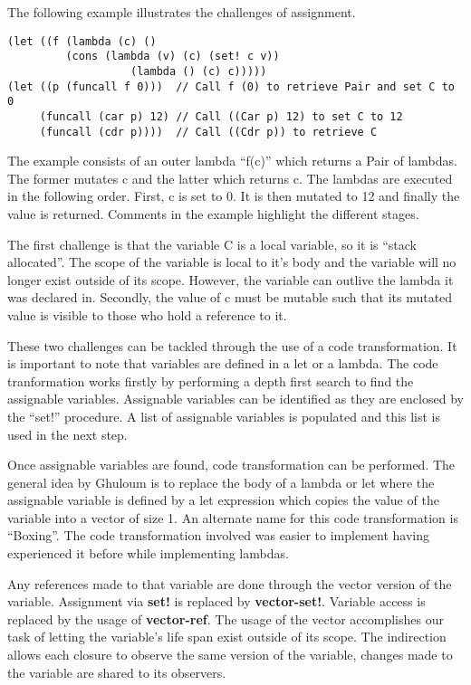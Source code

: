 \documentclass{article}
\begin{document}
The following example illustrates the challenges of assignment.

\begin{verbatim}
(let ((f (lambda (c) ()
     	 (cons (lambda (v) (c) (set! c v))
	       	       (lambda () (c) c)))))
(let ((p (funcall f 0)))  // Call f (0) to retrieve Pair and set C to 0
     (funcall (car p) 12) // Call ((Car p) 12) to set C to 12
     (funcall (cdr p))))  // Call ((Cdr p)) to retrieve C

\end{verbatim}

The example consists of an outer lambda ``f(c)'' which returns a Pair of lambdas. The former mutates c and the latter which returns c. The lambdas are executed in the following order. First, c is set to 0. It is then mutated to 12 and finally the value is returned. Comments in the example highlight the different stages.

The first challenge is that the variable C is a local variable, so it is ``stack allocated''. The scope of the variable is local to it's body and the variable will no longer exist outside of its scope. However, the variable can outlive the lambda it was declared in. Secondly, the value of c must be mutable such that its mutated value is visible to those who hold a reference to it.

These two challenges can be tackled through the use of a code transformation. It is important to note that variables are defined in a let or a lambda. The code tranformation works firstly by performing a depth first search to find the assignable variables. Assignable variables can be identified as they are enclosed by the ``set!'' procedure. A list of assignable variables is populated and this list is used in the next step. 

Once assignable variables are found, code transformation can be performed. The general idea by Ghuloum is to replace the body of a lambda or let where the assignable variable is defined by a let expression which copies the value of the variable into a vector of size 1. An alternate name for this code transformation is ``Boxing''. The code transformation involved was easier to implement having experienced it before while implementing lambdas. 

Any references made to that variable are done through the vector version of the variable. Assignment via \textbf{set!} is replaced by \textbf{vector-set!}. Variable access is replaced by the usage of \textbf{vector-ref}. The usage of the vector accomplishes our task of letting the variable's life span exist outside of its scope. The indirection allows each closure to observe the same version of the variable, changes made to the variable are shared to its observers.
\end{document}
